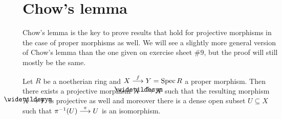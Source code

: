 \documentclass[a4paper,parskip=half,numbers=enddot, DIV=12]{scrreprt}
\begin{document}
\section{Chow's lemma}
Chow's lemma is the key to prove results that hold for projective morphisms in the case of proper morphisms as well. We will see a slightly more general version of Chow's lemma than the one given on exercise sheet \#9, but the proof will still mostly be the same.
\begin{thm}
	Let $R$ be a noetherian ring and $X\morphism[f]Y=\Spec R$ a proper morphism. Then there exists a projective morphism $\snake{X}\morphism[\pi]X$ such that the resulting morphism $\snake{X}\morphism Y$ is projective as well and moreover there is a dense open subset $U\subseteq X$ such that $\pi^{-1}(U)\morphism[\pi]U$ is an isomorphism.
\end{thm}
\end{document}
